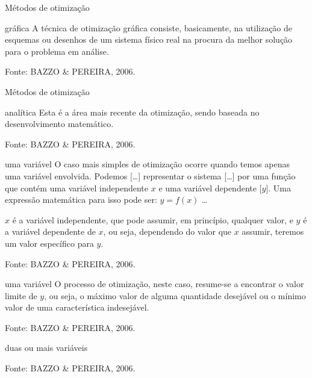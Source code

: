 \documentclass{beamer}
\begin{document}
\begin{frame}{Métodos de otimização}
  \begin{block}{gráfica}
    A técnica de otimização gráfica consiste, basicamente, na
    utilização de esquemas ou desenhos de um sistema físico real na
    procura da melhor solução para o problema em análise.
  \end{block}

\vfill
Fonte: BAZZO \& PEREIRA, 2006.
\end{frame}

\begin{frame}{Métodos de otimização}
  \begin{block}{analítica}
    Esta é a área mais recente da otimização, sendo baseada no
    desenvolvimento matemático.
  \end{block}

\vfill
Fonte: BAZZO \& PEREIRA, 2006.
\end{frame}

\begin{frame}
  \begin{block}{uma variável}
    O caso mais simples de otimização ocorre quando temos apenas uma
    variável envolvida. Podemos [\ldots] representar o sistema
    [\ldots] por uma função que contém uma variável independente $x$ e
    uma variável dependente [$y$]. Uma expressão matemática para isso
    pode ser: $y = f (x)$ \ldots
  \end{block}
  \begin{block}{}
    $x$ é a variável independente, que pode assumir, em princípio,
    qualquer valor, e $y$ é a variável dependente de $x$, ou seja,
    dependendo do valor que $x$ assumir, teremos um valor específico
    para $y$.
  \end{block}

\vfill
Fonte: BAZZO \& PEREIRA, 2006.
\end{frame}

\begin{frame}
    \begin{block}{uma variável}
    O processo de otimização, neste caso, resume-se a encontrar o
    valor limite de $y$, ou seja, o máximo valor de alguma quantidade
    desejável ou o mínimo valor de uma característica indesejável.
  \end{block}

\vfill
Fonte: BAZZO \& PEREIRA, 2006.
\end{frame}

\begin{frame}
  \begin{block}{duas ou mais variáveis}

  \end{block}

\vfill
Fonte: BAZZO \& PEREIRA, 2006.
\end{frame}
\end{document}
